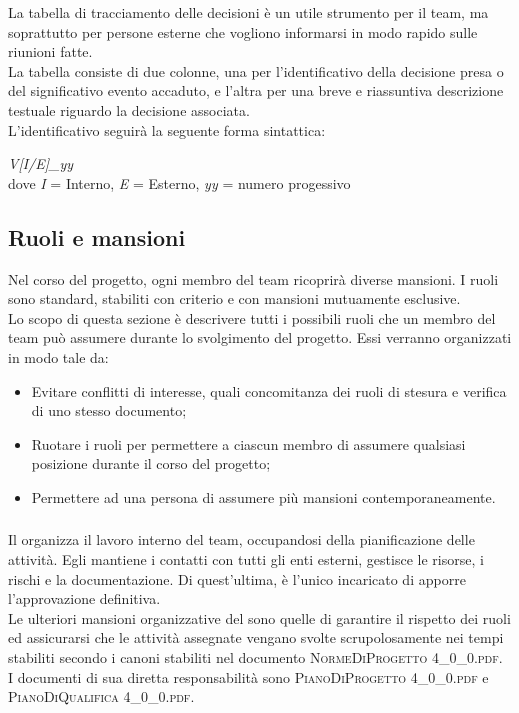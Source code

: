 			La tabella di tracciamento delle decisioni è un utile strumento per il team, ma soprattutto per persone esterne che vogliono informarsi in modo rapido sulle riunioni fatte.\\
			La tabella consiste di due colonne, una per l'identificativo della decisione presa o del significativo evento accaduto, e l'altra per una breve e riassuntiva descrizione testuale riguardo la decisione associata.\\
			L'identificativo seguirà la seguente forma sintattica:
			\begin{center}
				\textit{V[I/E]\_yy} \\\vspace{0.2cm}dove \textit{I} = Interno, \textit{E} = Esterno, \textit{yy} = numero progessivo
			\end{center}
	
	\newpage	
	\subsection{Ruoli e mansioni}
	Nel corso del progetto, ogni membro del team ricoprirà diverse mansioni. I ruoli sono standard, stabiliti con criterio e con mansioni mutuamente esclusive.\\
	Lo scopo di questa sezione è descrivere tutti i possibili ruoli che un membro del team può assumere durante lo svolgimento del progetto. Essi verranno organizzati in modo tale da:
	\begin{itemize}
		\item Evitare conflitti di interesse, quali concomitanza dei ruoli di stesura e verifica di uno stesso documento;
		\item Ruotare i ruoli per permettere a ciascun membro di assumere qualsiasi posizione durante il corso del progetto;
		\item Permettere ad una persona di assumere più mansioni contemporaneamente.
	\end{itemize}

		\subsubsection{\RdP}
		Il \textit{\RdP} organizza il lavoro interno del team, occupandosi della pianificazione delle attività. Egli mantiene i contatti con tutti gli enti esterni, gestisce le risorse, i rischi e la documentazione. Di quest'ultima, è l'unico incaricato di apporre l'approvazione definitiva.\\ Le ulteriori mansioni organizzative del \textit{\RdP} sono quelle di garantire il rispetto dei ruoli ed assicurarsi che le attività assegnate vengano svolte scrupolosamente nei tempi stabiliti secondo i canoni stabiliti nel documento \textsc{NormeDiProgetto 4\_0\_0.pdf}.\\
		I documenti di sua diretta responsabilità sono \textsc{PianoDiProgetto 4\_0\_0.pdf} e \textsc{PianoDiQualifica 4\_0\_0.pdf}.

